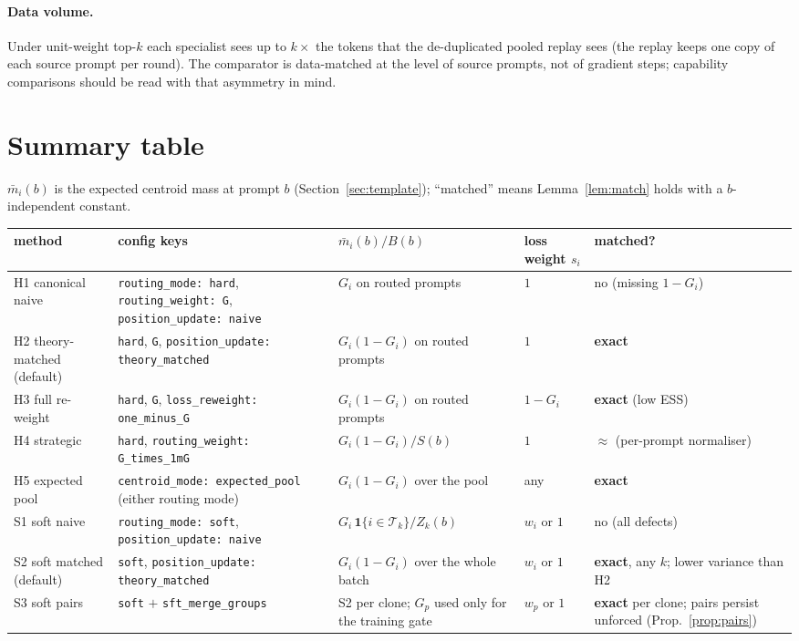 \documentclass[11pt]{article}
\theoremstyle{remark}
\newcommand{\ind}[1]{\mathbf{1}\{#1\}}
\newcommand{\Tk}{\mathcal{T}_k}
\newcommand{\cfg}[1]{\texttt{#1}}
\begin{document}
\paragraph{Data volume.}
Under unit-weight top-$k$ each specialist sees up to $k\times$ the tokens
that the de-duplicated pooled replay sees (the replay keeps one copy of each
source prompt per round). The comparator is data-matched at the level of
source prompts, not of gradient steps; capability comparisons should be read
with that asymmetry in mind.

\section{Summary table}

$\bar m_i(b)$ is the expected centroid mass at prompt $b$
(Section~\ref{sec:template}); ``matched'' means Lemma~\ref{lem:match} holds
with a $b$-independent constant.

\begin{center}
\footnotesize
\setlength{\tabcolsep}{4pt}
\begin{tabular}{@{}>{\raggedright\arraybackslash}p{2.6cm}>{\raggedright\arraybackslash}p{4.3cm}>{\raggedright\arraybackslash}p{3.5cm}>{\raggedright\arraybackslash}p{1.5cm}>{\raggedright\arraybackslash}p{3.3cm}@{}}
\toprule
method & config keys & $\bar m_i(b)/B(b)$ & loss weight $s_i$ & matched? \\
\midrule
H1 canonical naive & \cfg{routing\_mode: hard}, \cfg{routing\_weight: G}, \cfg{position\_update: naive} & $G_i$ on routed prompts & $1$ & no (missing $1-G_i$) \\[3pt]
H2 theory-matched (default) & \cfg{hard}, \cfg{G}, \cfg{position\_update: theory\_matched} & $G_i(1-G_i)$ on routed prompts & $1$ & \textbf{exact} \\[3pt]
H3 full re-weight & \cfg{hard}, \cfg{G}, \cfg{loss\_reweight: one\_minus\_G} & $G_i(1-G_i)$ on routed prompts & $1-G_i$ & \textbf{exact} (low ESS) \\[3pt]
H4 strategic & \cfg{hard}, \cfg{routing\_weight: G\_times\_1mG} & $G_i(1-G_i)/S(b)$ & $1$ & $\approx$ (per-prompt normaliser) \\[3pt]
H5 expected pool & \cfg{centroid\_mode: expected\_pool} (either routing mode) & $G_i(1-G_i)$ over the pool & any & \textbf{exact} \\[3pt]
S1 soft naive & \cfg{routing\_mode: soft}, \cfg{position\_update: naive} & $G_i\,\ind{i\in\Tk}/Z_k(b)$ & $w_i$ or $1$ & no (all defects) \\[3pt]
S2 soft matched (default) & \cfg{soft}, \cfg{position\_update: theory\_matched} & $G_i(1-G_i)$ over the whole batch & $w_i$ or $1$ & \textbf{exact}, any $k$; lower variance than H2 \\[3pt]
S3 soft pairs & \cfg{soft} $+$ \cfg{sft\_merge\_groups} & S2 per clone; $G_p$ used only for the training gate & $w_p$ or $1$ & \textbf{exact} per clone; pairs persist unforced (Prop.~\ref{prop:pairs}) \\
\bottomrule
\end{tabular}
\end{center}
\end{document}

